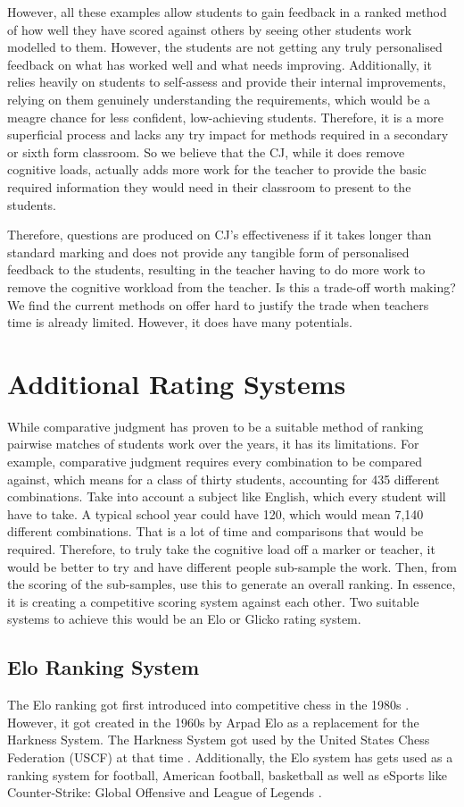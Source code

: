 		However, all these examples allow students to gain feedback in a ranked method of how well they have scored against others by seeing other students work modelled to them. However, the students are not getting any truly personalised feedback on what has worked well and what needs improving. Additionally, it relies heavily on students to self-assess and provide their internal improvements, relying on them genuinely understanding the requirements, which would be a meagre chance for less confident, low-achieving students. Therefore, it is a more superficial process and lacks any try impact for methods required in a secondary or sixth form classroom. So we believe that the CJ, while it does remove cognitive loads, actually adds more work for the teacher to provide the basic required information they would need in their classroom to present to the students. 
		
		Therefore, questions are produced on CJ's effectiveness if it takes longer than standard marking and does not provide any tangible form of personalised feedback to the students, resulting in the teacher having to do more work to remove the cognitive workload from the teacher. Is this a trade-off worth making? We find the current methods on offer hard to justify the trade when teachers time is already limited. However, it does have many potentials.
		
	
	\section{Additional Rating Systems}
		While comparative judgment has proven to be a suitable method of ranking pairwise matches of students work over the years, it has its limitations. For example, comparative judgment requires every combination to be compared against, which means for a class of thirty students, accounting for 435 different combinations. Take into account a subject like English, which every student will have to take. A typical school year could have 120, which would mean 7,140 different combinations. That is a lot of time and comparisons that would be required. Therefore, to truly take the cognitive load off a marker or teacher, it would be better to try and have different people sub-sample the work. Then, from the scoring of the sub-samples, use this to generate an overall ranking. In essence, it is creating a competitive scoring system against each other. Two suitable systems to achieve this would be an Elo or Glicko rating system.
	
	\subsection{Elo Ranking System}
		The Elo ranking got first introduced into competitive chess in the 1980s \cite{weng2011bayesian}. However, it got created in the 1960s by Arpad Elo as a replacement for the Harkness System. The Harkness System got used by the United States Chess Federation (USCF) at that time \cite{elo1978rating}. Additionally, the Elo system has gets used as a ranking system for football, American football, basketball as well as eSports like Counter-Strike: Global Offensive and League of Legends \cite{silver2015we, pradhan2020power}.
		
